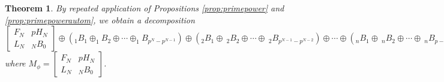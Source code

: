 \documentclass[preprint,12pt]{elsarticle}
\newtheorem{thm}{Theorem}[section]
\theoremstyle{definition}
\theoremstyle{remark}
\begin{document}
\begin{thm}\label{thm:fullprimedecomp}
By repeated application of Propositions \ref{prop:primepower} and \ref{prop:primepowerautom}, we obtain a decomposition
\[
 \left[\begin{array}{rr} F_N & pH_N \\ L_N & _NB_0 \end{array}\right]
\oplus \left( _1B_1 \oplus _1B_2 \oplus \cdots \oplus _1B_{p^N-p^{N-1}} \right)
\oplus \left( _2B_1 \oplus\  _2B_2 \oplus \cdots \oplus\  _2B_{p^{N-1}-p^{N-2}}\right) \oplus \cdots
\oplus\left( _nB_1 \oplus\ _nB_2 \oplus \cdots \oplus\ _nB_{p-1}\right)
\]
where $M_\phi = \left[\begin{array}{rr} F_N & pH_N \\ L_N & _NB_0 \end{array}\right]$.
\end{thm}
\end{document}

